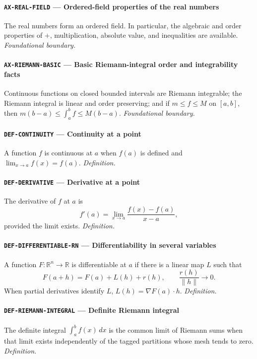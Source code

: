 \documentclass[10pt]{article}
\newcommand{\pidraw}[1]{\begingroup\urlstyle{tt}\nolinkurl{#1}\endgroup}
\theoremstyle{definition}
\theoremstyle{remark}
\begin{document}
\paragraph{\pidraw{AX-REAL-FIELD} --- Ordered-field properties of the real numbers}
The real numbers form an ordered field. In particular, the algebraic and order properties of $+$, multiplication, absolute value, and inequalities are available.
\textit{Foundational boundary.}

\paragraph{\pidraw{AX-RIEMANN-BASIC} --- Basic Riemann-integral order and integrability facts}
Continuous functions on closed bounded intervals are Riemann integrable; the Riemann integral is linear and order preserving; and if $m\le f\le M$ on $[a,b]$, then $m(b-a)\le\int_a^b f\le M(b-a)$.
\textit{Foundational boundary.}

\paragraph{\pidraw{DEF-CONTINUITY} --- Continuity at a point}
A function $f$ is continuous at $a$ when $f(a)$ is defined and $\lim_{x\to a}f(x)=f(a)$.
\textit{Definition.}

\paragraph{\pidraw{DEF-DERIVATIVE} --- Derivative at a point}
The derivative of $f$ at $a$ is
\[
f'(a)=\lim_{x\to a}\frac{f(x)-f(a)}{x-a},
\]
provided the limit exists.
\textit{Definition.}

\paragraph{\pidraw{DEF-DIFFERENTIABLE-RN} --- Differentiability in several variables}
A function $F:\mathbb{R}^n\to\mathbb{R}$ is differentiable at $a$ if there is a linear map $L$ such that
\[
F(a+h)=F(a)+L(h)+r(h),\qquad \frac{r(h)}{\|h\|}\to0.
\]
When partial derivatives identify $L$, $L(h)=\nabla F(a)\cdot h$.
\textit{Definition.}

\paragraph{\pidraw{DEF-RIEMANN-INTEGRAL} --- Definite Riemann integral}
The definite integral $\int_a^b f(x)\,dx$ is the common limit of Riemann sums when that limit exists independently of the tagged partitions whose mesh tends to zero.
\textit{Definition.}
\end{document}
